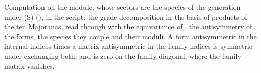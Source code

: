 Computation on the module, whose sectors are the species of the generation under (S) (), in the script: the grade decomposition in the basis of products of the ten Majoranas, read through  with the equivariance of , the antisymmetry of the forms, the species they couple and their moduli. A form antisymmetric in the internal indices times a matrix antisymmetric in the family indices is symmetric under exchanging both, and is zero on the family diagonal, where the family matrix vanishes.
